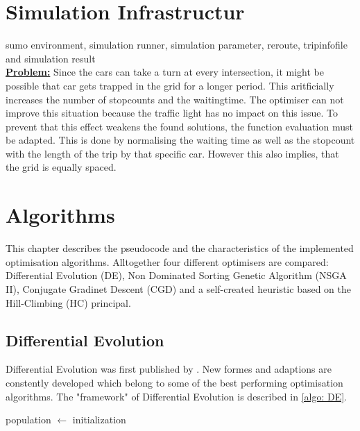 \documentclass[./\jobname.tex]{subfiles}
\begin{document}
\newpage


\chapter{Simulation Infrastructur}
sumo environment, simulation runner, simulation parameter, reroute, tripinfofile and simulation result\\

\textbf{\underline{Problem:}} Since the cars can take a turn at every intersection, it might be possible that car gets trapped in the grid for a longer period. This aritficially increases the number of stopcounts and the waitingtime. The optimiser can not improve this situation because the traffic light has no impact on this issue. To prevent that this effect weakens the found solutions, the function evaluation must be adapted. This is done by normalising the waiting time as well as the stopcount with the length of the trip by that specific car. However this also implies, that the grid is equally spaced. 

\chapter{Algorithms}
This chapter describes the pseudocode and the characteristics of the implemented optimisation algorithms. Alltogether four different optimisers are compared: Differential Evolution (DE), Non Dominated Sorting Genetic Algorithm (NSGA II), Conjugate Gradinet Descent (CGD) and a self-created heuristic based on the Hill-Climbing (HC) principal. 

\section{Differential Evolution}

Differential Evolution was first published by \cite{storn_differential_1997}. New formes and adaptions are constently developed which belong to some of the best performing optimisation algorithms. The "framework" of Differential Evolution is described in \autoref{algo: DE}. 

\begin{algorithm}
	\SetAlgoNoLine
	\DontPrintSemicolon
	population $\gets$ initialization\;
	\label{algo: DE}
\end{algorithm}
\end{document}
